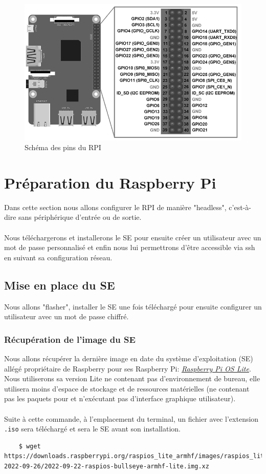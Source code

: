 \documentclass[a4paper]{article}
\begin{document}
\begin{figure}[!ht]
    \centering
    \includegraphics[scale=0.5]{gpio_pins_grayscale.png}
    \caption{Schéma des pins du RPI}
\end{figure}
\section{Préparation du Raspberry Pi}
Dans cette section nous allons configurer le RPI de manière "headless", c'est-à-dire sans périphérique d'entrée ou de sortie.\\\\Nous téléchargerons et installerons le SE pour ensuite créer un utilisateur avec un mot de passe personnalisé et enfin nous lui permettrons d'être accessible via ssh en suivant sa configuration réseau.
\subsection{Mise en place du SE}
Nous allons "flasher", installer le SE une fois téléchargé pour ensuite configurer un utilisateur avec un mot de passe chiffré.
\subsubsection{Récupération de l'image du SE}
Nous allons récupérer la dernière image en date du système d'exploitation (SE) allégé propriétaire de Raspberry pour ses Raspberry Pi: \href{https://www.raspberrypi.com/software/operating-systems/}{\textit{Raspberry Pi OS Lite}}. Nous utiliserons sa version Lite ne contenant pas d'environnement de bureau, elle utilisera moins d'espace de stockage et de ressources matérielles (ne contenant pas les paquets pour et n'exécutant pas d'interface graphique utilisateur).\\\\ Suite à cette commande, à l'emplacement du terminal, un fichier avec l'extension \verb|.iso| sera téléchargé et sera le SE avant son installation.
\begin{lstlisting}
    $ wget https://downloads.raspberrypi.org/raspios_lite_armhf/images/raspios_lite_armhf-2022-09-26/2022-09-22-raspios-bullseye-armhf-lite.img.xz
\end{lstlisting}
\label{sec:sec01}
\end{document}
